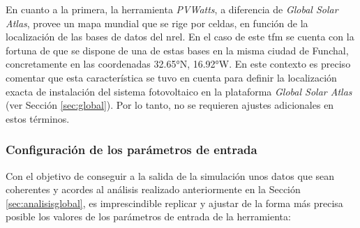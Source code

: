 \vspace{3mm}

En cuanto a la primera, la herramienta \textit{PVWatts}, a diferencia de \textit{Global Solar Atlas}, provee un mapa mundial que se rige por celdas, en función de la localización de las bases de datos del \gls{nrel}. En el caso de este \gls{tfm} se cuenta con la fortuna de que se dispone de una de estas bases en la misma ciudad de Funchal, concretamente en las coordenadas 32.65°N, 16.92°W. En este contexto es preciso comentar que esta característica se tuvo en cuenta para definir la localización exacta de instalación del sistema fotovoltaico en la plataforma \textit{Global Solar Atlas} (ver Sección \ref{sec:global}). Por lo tanto, no se requieren ajustes adicionales en estos términos.  

\subsubsection{Configuración de los parámetros de entrada}

Con el objetivo de conseguir a la salida de la simulación unos datos que sean coherentes y acordes al análisis realizado anteriormente en la Sección \ref{sec:analisisglobal}, es imprescindible replicar y ajustar de la forma más precisa posible los valores de los parámetros de entrada de la herramienta: 

\pagebreak

